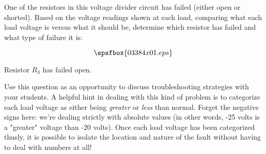 

One of the resistors in this voltage divider circuit has failed (either open or shorted).  Based on the voltage readings shown at each load, comparing what each load voltage is versus what it should be, determine which resistor has failed and what type of failure it is:

$$\epsfbox{03384x01.eps}$$







Resistor $R_3$ has failed open.







Use this question as an opportunity to discuss troubleshooting strategies with your students.  A helpful hint in dealing with this kind of problem is to categorize each load voltage as either being {\it greater} or {\it less} than normal.  Forget the negative signs here: we're dealing strictly with absolute values (in other words, -25 volts is a "greater" voltage than -20 volts).  Once each load voltage has been categorized thusly, it is possible to isolate the location and nature of the fault without having to deal with numbers at all!




